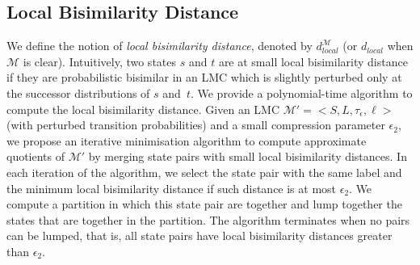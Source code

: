 \documentclass[a4paper,UKenglish,cleveref,autoref,thm-restate]{lipics-v2021}
\newcommand{\local}{\mathit{local}}
\newcommand{\M}{\mathcal{M}}
\newcommand{\Hyp}{\mathcal{M}'}%
\newcommand{\tauHyp}{\tau_{\epsilon}}
\newcommand{\Q}{\mathcal{Q}}
\begin{document}

\subsection{Local Bisimilarity Distance}\label{subsection:local-bisimilarity-distances}

We define the notion of \emph{local bisimilarity distance}, denoted by $d_{\local}^{\M}$ (or $d_{\local}$ when $\M$ is clear). Intuitively, two states $s$ and $t$ are at small local bisimilarity distance if they are probabilistic bisimilar in an LMC which is slightly perturbed only at the successor distributions of $s$ and~$t$. We provide a polynomial-time algorithm to compute the local bisimilarity distance. Given an LMC $\Hyp = <S, L, \tauHyp, \ell>$ (with perturbed transition probabilities) and a small compression parameter $\epsilon_2$, we propose an iterative minimisation algorithm to compute approximate quotients of $\Hyp$ by merging state pairs with small local bisimilarity distances. In each iteration of the algorithm, we select the state pair with the same label and the minimum local bisimilarity distance if such distance is at most $\epsilon_2$. We compute a partition in which this state pair are together and lump together the states that are together in the partition. The algorithm terminates when no pairs can be lumped, that is, all state pairs have local bisimilarity distances greater than $\epsilon_2$. %
\end{document}
